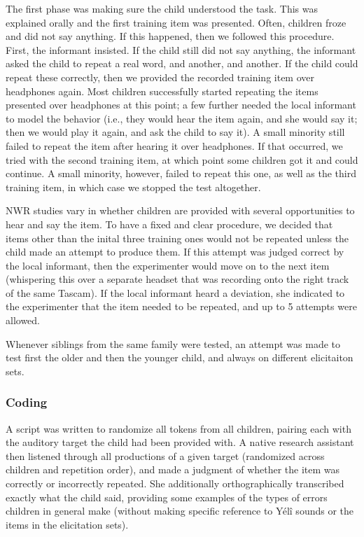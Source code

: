 \documentclass[english,,man,floatsintext]{apa6}
\begin{document}
The first phase was making sure the child understood the task. This was
explained orally and the first training item was presented. Often,
children froze and did not say anything. If this happened, then we
followed this procedure. First, the informant insisted. If the child
still did not say anything, the informant asked the child to repeat a
real word, and another, and another. If the child could repeat these
correctly, then we provided the recorded training item over headphones
again. Most children successfully started repeating the items presented
over headphones at this point; a few further needed the local informant
to model the behavior (i.e., they would hear the item again, and she
would say it; then we would play it again, and ask the child to say it).
A small minority still failed to repeat the item after hearing it over
headphones. If that occurred, we tried with the second training item, at
which point some children got it and could continue. A small minority,
however, failed to repeat this one, as well as the third training item,
in which case we stopped the test altogether.

NWR studies vary in whether children are provided with several
opportunities to hear and say the item. To have a fixed and clear
procedure, we decided that items other than the inital three training
ones would not be repeated unless the child made an attempt to produce
them. If this attempt was judged correct by the local informant, then
the experimenter would move on to the next item (whispering this over a
separate headset that was recording onto the right track of the same
Tascam). If the local informant heard a deviation, she indicated to the
experimenter that the item needed to be repeated, and up to 5 attempts
were allowed.

Whenever siblings from the same family were tested, an attempt was made
to test first the older and then the younger child, and always on
different elicitaiton sets.

\subsubsection{Coding}\label{coding}

A script was written to randomize all tokens from all children, pairing
each with the auditory target the child had been provided with. A native
research assistant then listened through all productions of a given
target (randomized across children and repetition order), and made a
judgment of whether the item was correctly or incorrectly repeated. She
additionally orthographically transcribed exactly what the child said,
providing some examples of the types of errors children in general make
(without making specific reference to Yélî sounds or the items in the
elicitation sets).
\end{document}
